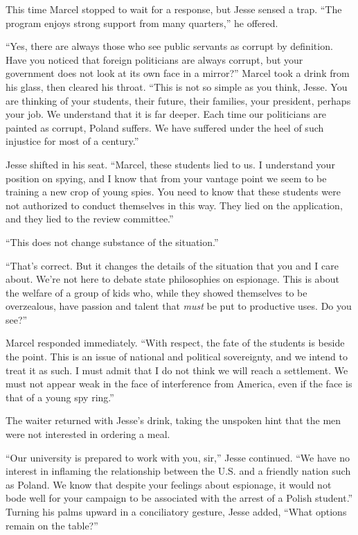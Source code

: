 \documentclass[12pt]{book}
\begin{document}
This time Marcel stopped to wait for a response, but Jesse sensed a trap.  ``The program enjoys strong support from many quarters,'' he offered.

``Yes, there are always those who see public servants as corrupt by definition.  Have you noticed that foreign politicians are always corrupt, but your government does not look at its own face in a mirror?''  Marcel took a drink from his glass, then cleared his throat.  ``This is not so simple as you think, Jesse.  You are thinking of your students, their future, their families, your president, perhaps your job.  We understand that it is far deeper.  Each time our politicians are painted as corrupt, Poland suffers.  We have suffered under the heel of such injustice for most of a century.''

Jesse shifted in his seat.  ``Marcel, these students lied to us.  I understand your position on spying, and I know that from your vantage point we seem to be training a new crop of young spies.  You need to know that these students were not authorized to conduct themselves in this way.  They lied on the application, and they lied to the review committee.''

``This does not change substance of the situation.''

``That's correct.  But it changes the details of the situation that you and I care about.  We're not here to debate state philosophies on espionage.  This is about the welfare of a group of kids who, while they showed themselves to be overzealous, have passion and talent that \emph{must} be put to productive uses.  Do you see?''

Marcel responded immediately.  ``With respect, the fate of the students is beside the point.  This is an issue of national and political sovereignty, and we intend to treat it as such.  I must admit that I do not think we will reach a settlement.  We must not appear weak in the face of interference from America, even if the face is that of a young spy ring.''

The waiter returned with Jesse's drink, taking the unspoken hint that the men were not interested in ordering a meal.

``Our university is prepared to work with you, sir,'' Jesse continued.  ``We have no interest in inflaming the relationship between the U.S. and a friendly nation such as Poland.  We know that despite your feelings about espionage, it would not bode well for your campaign to be associated with the arrest of a Polish student.''  Turning his palms upward in a conciliatory gesture, Jesse added, ``What options remain on the table?''
\end{document}
